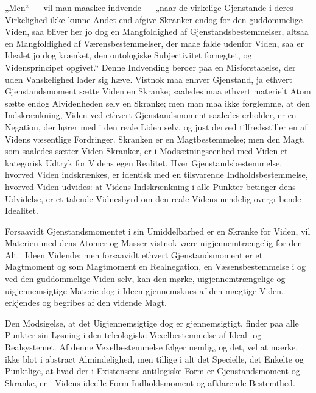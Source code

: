 \documentclass[11pt]{book}
\newcommand{\opage}[1]{\marginnote{\footnotesize\textit{[#1]}}}
\begin{document}
„Men“ --- vil man maaskee indvende --- „naar de virkelige Gjenstande
i deres Virkelighed ikke kunne Andet end afgive Skranker endog for
den guddommelige Viden, saa bliver her jo dog en Mangfoldighed af
Gjenstandsbestemmelser, altsaa en Mangfoldighed af
Værensbestemmelser, der maae falde udenfor Viden, saa er Idealet jo
dog krænket, den ontologiske Subjectivitet
fornegtet, og Vidensprincipet opgivet.“ Denne Indvending beroer paa
en Misforstaaelse, der uden Vanskelighed lader sig hæve. Vistnok maa
enhver Gjenstand, ja ethvert Gjenstandsmoment sætte Viden en Skranke;
saaledes maa ethvert materielt Atom sætte endog Alvidenheden selv en
Skranke; men man maa ikke forglemme, at den Indskrænkning, Viden ved
ethvert Gjenstandsmoment saaledes erholder, er en Negation, der hører
med i den reale Liden
selv, og just derved tilfredsstiller en af Videns væsentlige
Fordringer. Skranken er en Magtbestemmelse; men den Magt, som
saaledes sætter Viden Skranker, er i Modsætningseenhed med Viden et
kategorisk Udtryk for Videns egen Realitet. Hver
Gjenstandsbestemmelse, hvorved Viden indskrænkes, er identisk med en
tilsvarende Indholdsbestemmelse, hvorved Viden udvides: at Videns
Indskrænkning i alle Punkter betinger dens Udvidelse, er et talende
Vidnesbyrd om den reale Videns uendelig overgribende Idealitet.

Forsaavidt Gjenstandsmomentet i sin Umiddelbarhed er
\opage{262} \setcounter{footnote}{0}%
en Skranke for Viden, vil Materien med dens Atomer og Masser vistnok
være uigjennemtrængelig for den Alt i Ideen Vidende; men forsaavidt
ethvert Gjenstandsmoment er et Magtmoment og som Magtmoment en
Realnegation, en Væsensbestemmelse i og ved den guddommelige Viden
selv, kan den mørke, uigjennemtrængelige og uigjennemsigtige Materie
dog i Ideen gjennemskues af den mægtige Viden, erkjendes og begribes
af den vidende Magt.

Den Modsigelse, at det Uigjennemsigtige dog er gjennemsigtigt, finder
paa alle Punkter sin Løsning i den teleologiske Vexelbestemmelse af
Ideal- og Realsystemet. Af denne Vexelbestemmelse følger nemlig, og
det, vel at mærke, ikke blot i abstract Almindelighed, men tillige i
alt det Specielle, det Enkelte og Punktlige, at hvad der i
Existensens antilogiske Form er Gjenstandsmoment og Skranke, er i
Videns ideelle Form Indholdsmoment og afklarende Bestemthed.
\end{document}
